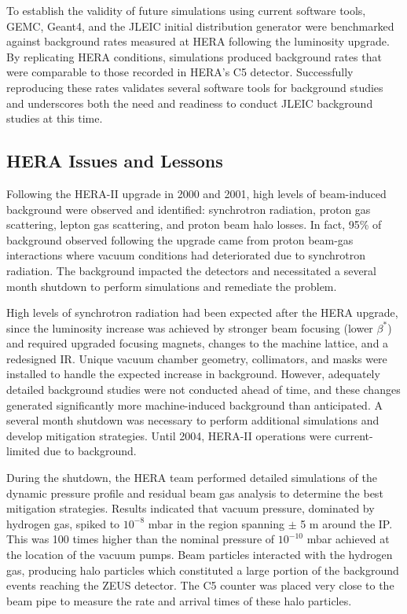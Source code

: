To establish the validity of future simulations using current software tools, GEMC, Geant4, and the JLEIC initial distribution generator were benchmarked against background rates measured at HERA following the luminosity upgrade.  By replicating HERA conditions, simulations produced background rates that were comparable to those recorded in HERA's C5 detector.  Successfully reproducing these rates validates several software tools for background studies and underscores both the need and readiness to conduct JLEIC background studies at this time.

\subsection{HERA Issues and Lessons}

Following the HERA-II upgrade in 2000 and 2001, high levels of beam-induced background were observed and identified: synchrotron radiation, proton gas scattering, lepton gas scattering, and proton beam halo losses.   In fact, 95\% of background observed following the upgrade came from proton beam-gas interactions where vacuum conditions had deteriorated due to synchrotron radiation.  The background impacted the detectors and necessitated a several month shutdown to perform simulations and remediate the problem.

High levels of synchrotron radiation had been expected after the HERA upgrade, since the luminosity increase was achieved by stronger beam focusing (lower $\beta^*$) and required upgraded focusing magnets, changes to the machine lattice, and a redesigned IR. Unique vacuum chamber geometry, collimators, and masks were installed to handle the expected increase in background.  However, adequately detailed background studies were not conducted ahead of time, and these changes generated significantly more machine-induced background than anticipated.  A several month shutdown was necessary to perform additional simulations and develop mitigation strategies.  Until 2004, HERA-II operations were current-limited due to background.

During the shutdown, the HERA team performed detailed simulations of the dynamic pressure profile and residual beam gas analysis to determine the best mitigation strategies.  Results indicated that vacuum pressure, dominated by hydrogen gas, spiked to $10^{-8}$ mbar in the region spanning $\pm$ 5 m around the IP.   This  was 100 times higher than the nominal pressure of $10^{-10}$ mbar achieved at the location of the vacuum pumps.  Beam particles interacted with the hydrogen gas, producing halo particles which constituted a large portion of the background events reaching the ZEUS detector.  The C5 counter was placed very close to the beam pipe to measure the rate and arrival times of these halo particles.

